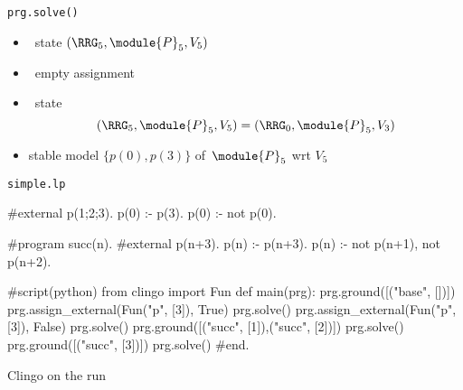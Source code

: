\begin{frame}{\texttt{prg.solve()}}
  \begin{itemize}
  \item {} \clingo\ state $(\boldsymbol{\RRG}_5,\module{P}_5,V_5 )$
  \item {} \ empty assignment
    \medskip
  \item<2->  \clingo\ state
    \[
      (\boldsymbol{\RRG}_5,\module{P}_5,V_5 )
    = (\boldsymbol{\RRG}_0,\module{P}_5,V_3 )
    \]
  \item<3->  stable model $\{p(0),p(3)\}$ of~$\module{P}_5$ wrt $V_5$
  \end{itemize}
\end{frame}
\begin{frame}[fragile]{\texttt{simple.lp}}
\scriptsize\vspace{-10pt}%
\begin{semiverbatim}
   #external p(1;2;3).
   p(0) :- p(3).
   p(0) :- not p(0).

   #program succ(n).
   #external p(n+3).
   p(n) :- p(n+3).
   p(n) :- not p(n+1), not p(n+2).

   #script(python)
   from clingo import Fun
   def main(prg):
       prg.ground([("base", [])])
       prg.assign_external(Fun("p", [3]), True)
       prg.solve()
       prg.assign_external(Fun("p", [3]), False)
       prg.solve()
       prg.ground([("succ", [1]),("succ", [2])])
       prg.solve()
       prg.ground([("succ", [3])])
       prg.solve()
   #end.
\end{semiverbatim}
\end{frame}
\begin{frame}[fragile]{Clingo on the run}
\footnotesize
{}
\end{frame}
%
